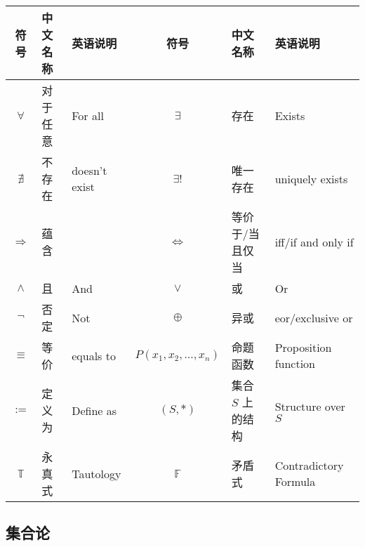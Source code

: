 \documentclass[UTF8]{ctexart}
\begin{document}
            \begin{center}
                \begin{tabular}{|c|l|l||c|l|l|}
                    \hline
                    符号 & 中文名称 & 英语说明 & 符号 & 中文名称 & 英语说明\\
                    \hline\hline
                    $\forall$ & 对于任意 & For all & $\exists$ & 存在 & Exists\\
                    \hline
                    $\nexists$ & 不存在 & doesn't exist &$\exists !$& 唯一存在 & uniquely exists\\
                    \hline
                    $\Longrightarrow$ & 蕴含 & & $\iff$ & 等价于/当且仅当 & iff/if and only if\\
                    \hline
                    $\wedge$ & 且 & And & $\vee$ & 或 & Or\\
                    \hline
                    $\neg$ & 否定 & Not & $\oplus$ & 异或 & eor/exclusive or\\
                    \hline
                    $\equiv$ & 等价 & equals to & $P(x_1,x_2,...,x_n)$ & 命题函数 & Proposition function\\
                    \hline
                    $:=$ & 定义为 & Define as & $(S,*)$ & 集合 $S$ 上的结构 & Structure over $S$\\
                    \hline
                    $\mathbb{T}$ & 永真式 & Tautology & $\mathbb{F}$ & 矛盾式 & Contradictory Formula\\
                    \hline
                \end{tabular}
            \end{center}

        \subsection{集合论}
        
\end{document}
